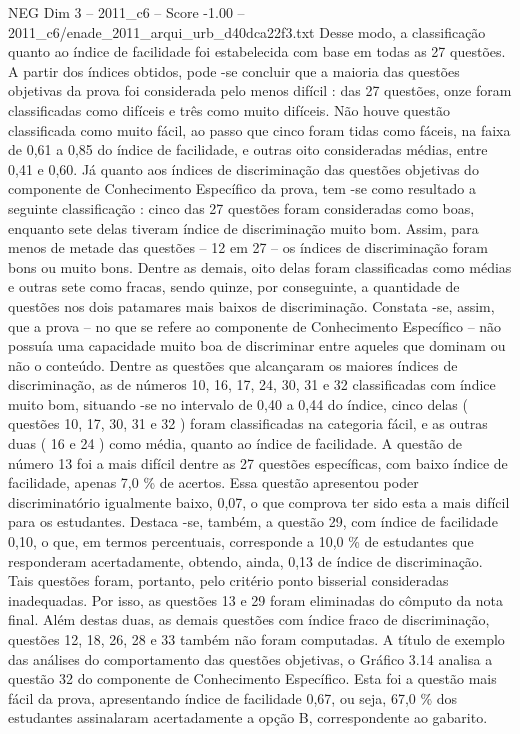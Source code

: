 \begin{textsample}{NEG Dim 3 – 2011\_c6 – Score -1.00 – 2011\_c6/enade\_2011\_arqui\_urb\_d40dca22f3.txt}
Desse modo, a classificação quanto ao índice de facilidade foi estabelecida com base em todas as 27 questões.
A partir dos índices obtidos, pode -se concluir que a maioria das questões objetivas da prova foi considerada pelo menos difícil : das 27 questões, onze foram classificadas como difíceis e três como muito difíceis.
Não houve questão classificada como muito fácil, ao passo que cinco foram tidas como fáceis, na faixa de 0,61 a 0,85 do índice de facilidade, e outras oito consideradas médias, entre 0,41 e 0,60.
Já quanto aos índices de discriminação das questões objetivas do componente de Conhecimento Específico da prova, tem -se como resultado a seguinte classificação : cinco das 27 questões foram consideradas como boas, enquanto sete delas tiveram índice de discriminação muito bom.
Assim, para menos de metade das questões – 12 em 27 – os índices de discriminação foram bons ou muito bons.
Dentre as demais, oito delas foram classificadas como médias e outras sete como fracas, sendo quinze, por conseguinte, a quantidade de questões nos dois patamares mais baixos de discriminação.
Constata -se, assim, que a prova – no que se refere ao componente de Conhecimento Específico – não possuía uma capacidade muito boa de discriminar entre aqueles que dominam ou não o conteúdo.
Dentre as questões que alcançaram os maiores índices de discriminação, as de números 10, 16, 17, 24, 30, 31 e 32 classificadas com índice muito bom, situando -se no intervalo de 0,40 a 0,44 do índice, cinco delas ( questões 10, 17, 30, 31 e 32 ) foram classificadas na categoria fácil, e as outras duas ( 16 e 24 ) como média, quanto ao índice de facilidade.
A questão de número 13 foi a mais difícil dentre as 27 questões específicas, com baixo índice de facilidade, apenas 7,0 \% de acertos.
Essa questão apresentou poder discriminatório igualmente baixo, 0,07, o que comprova ter sido esta a mais difícil para os estudantes.
Destaca -se, também, a questão 29, com índice de facilidade 0,10, o que, em termos percentuais, corresponde a 10,0 \% de estudantes que responderam acertadamente, obtendo, ainda, 0,13 de índice de discriminação.
Tais questões foram, portanto, pelo critério ponto bisserial consideradas inadequadas.
Por isso, as questões 13 e 29 foram eliminadas do cômputo da nota final.
Além destas duas, as demais questões com índice fraco de discriminação, questões 12, 18, 26, 28 e 33 também não foram computadas.
A título de exemplo das análises do comportamento das questões objetivas, o Gráfico 3.14 analisa a questão 32 do componente de Conhecimento Específico.
Esta foi a questão mais fácil da prova, apresentando índice de facilidade 0,67, ou seja, 67,0 \% dos estudantes assinalaram acertadamente a opção B, correspondente ao gabarito.

\end{textsample}
